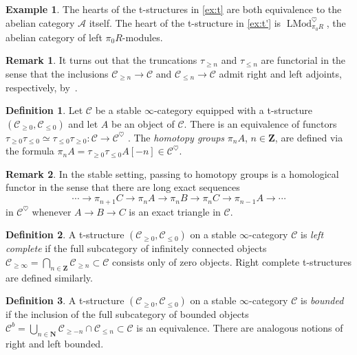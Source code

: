 \documentclass{article}
\theoremstyle{definition}
\newtheorem{definition}{Definition}[subsection]
\newtheorem{example}{Example}[subsection]
\newtheorem{remark}{Remark}[subsection]
\newcommand{\A}{\mathcal{A}}
\newcommand{\C}{\mathcal{C}}
\newcommand{\NN}{\mathbf{N}}
\newcommand{\ZZ}{\mathbf{Z}}
\renewcommand{\i}{\infty}
\DeclareMathOperator{\LMod}{LMod}
\begin{document}
\begin{example}
The hearts of the t-structures in \autoref{ex:t} are both equivalence to the abelian category $\A$ itself.
The heart of the t-structure in \autoref{ex:t'} is $\LMod_{\pi_0R}^{\heartsuit}$, the abelian category of left $\pi_0R$-modules.
\end{example}
\begin{remark}
It turns out that the truncations $\tau_{\geq n}$ and $\tau_{\leq n}$ are functorial in the
sense that the inclusions $\C_{\geq n}\rightarrow \C$ and $\C_{\leq n}\rightarrow
\C$ admit right and left adjoints, respectively, by~\cite[Corollary~1.2.1.6]{HA}.
\end{remark}
\begin{definition}\label{tshg}
Let $\C$ be a stable $\i$-category equipped with a t-structure $(\C_{\geq 0},\C_{\leq 0})$ and let $A$ be an object of $\C$.
There is an equivalence of functors $\tau_{\geq 0}\tau_{\leq 0}\simeq\tau_{\leq 0}\tau_{\geq 0}:\C\to\C^\heartsuit$ \cite[Proposition 1.2.1.10]{HA}.
The {\em homotopy groups} $\pi_n A$, $n\in\ZZ$, are defined via the formula $\pi_nA=\tau_{\geq 0}\tau_{\leq 0}A[-n]\in \C^{\heartsuit}$.
\end{definition}
\begin{remark}
In the stable setting, passing to homotopy groups is a homological functor in the sense that there are long exact sequences
$$\cdots\rightarrow\pi_{n+1}C\rightarrow\pi_nA\rightarrow\pi_nB\rightarrow\pi_nC\rightarrow\pi_{n-1}A\rightarrow\cdots$$
in $\C^\heartsuit$ whenever $A\rightarrow B\rightarrow C$ is an exact triangle in $\C$.
\end{remark}

\begin{definition}
A t-structure $(\C_{\geq 0},\C_{\leq 0})$ on a stable $\infty$-category $\C$ is {\em left complete} if the full subcategory of infinitely connected objects $\C_{\geq\infty}=\bigcap_{n\in\ZZ}\C_{\geq n}\subset\C$
consists only of zero objects.
{Right complete} t-structures are defined similarly.
\end{definition}

\begin{definition}
A t-structure $(\C_{\geq 0},\C_{\leq 0})$ on a stable $\infty$-category $\C$ is  {\em bounded} if the inclusion of the full subcategory of bounded objects $\C^b=\bigcup_{n\in\NN}\C_{\geq -n}\cap \C_{\leq n}\subset \C$ is an equivalence.
There are analogous notions of right and left bounded.
\end{definition}
\end{document}
